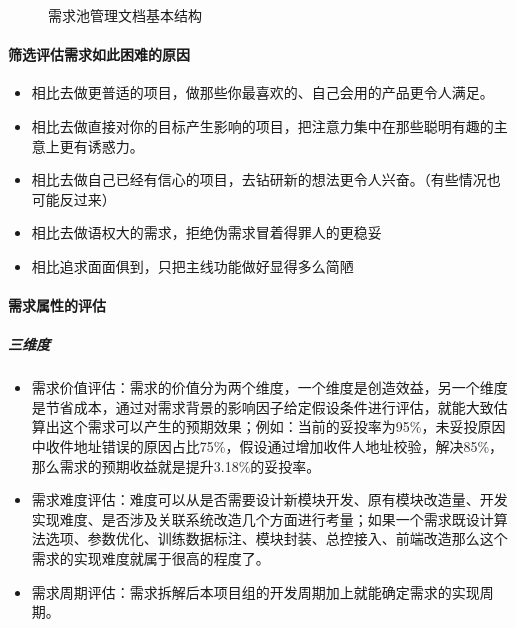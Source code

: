\documentclass[letterpaper,11pt,english]{sphinxmanual}
\begin{document}
\begin{figure}[H]
\centering
\capstart

\noindent{}
\caption{需求池管理文档基本结构\sphinxfootnotemark[584]}\label{\detokenize{chapter_knowledge/upgrade_manage:id23}}\end{figure}
%
\begin{footnotetext}[584]\sphinxAtStartFootnote
{}
%
\end{footnotetext}\ignorespaces 

\paragraph{筛选评估需求如此困难的原因}
\label{\detokenize{chapter_knowledge/upgrade_manage:id15}}\begin{itemize}
\item {} 
相比去做更普适的项目，做那些你最喜欢的、自己会用的产品更令人满足。

\item {} 
相比去做直接对你的目标产生影响的项目，把注意力集中在那些聪明有趣的主意上更有诱惑力。

\item {} 
相比去做自己已经有信心的项目，去钻研新的想法更令人兴奋。（有些情况也可能反过来）

\item {} 
相比去做语权大的需求，拒绝伪需求冒着得罪人的更稳妥

\item {} 
相比追求面面俱到，只把主线功能做好显得多么简陋

\end{itemize}


\paragraph{需求属性的评估}
\label{\detokenize{chapter_knowledge/upgrade_manage:id16}}

\subparagraph{三维度}
\label{\detokenize{chapter_knowledge/upgrade_manage:id17}}\begin{itemize}
\item {} 
需求价值评估：需求的价值分为两个维度，一个维度是创造效益，另一个维度是节省成本，通过对需求背景的影响因子给定假设条件进行评估，就能大致估算出这个需求可以产生的预期效果；例如：当前的妥投率为95\%，未妥投原因中收件地址错误的原因占比75\%，假设通过增加收件人地址校验，解决85\%，那么需求的预期收益就是提升3.18\%的妥投率。

\item {} 
需求难度评估：难度可以从是否需要设计新模块开发、原有模块改造量、开发实现难度、是否涉及关联系统改造几个方面进行考量；如果一个需求既设计算法选项、参数优化、训练数据标注、模块封装、总控接入、前端改造那么这个需求的实现难度就属于很高的程度了。

\item {} 
需求周期评估：需求拆解后本项目组的开发周期加上就能确定需求的实现周期。

\end{itemize}
\end{document}
